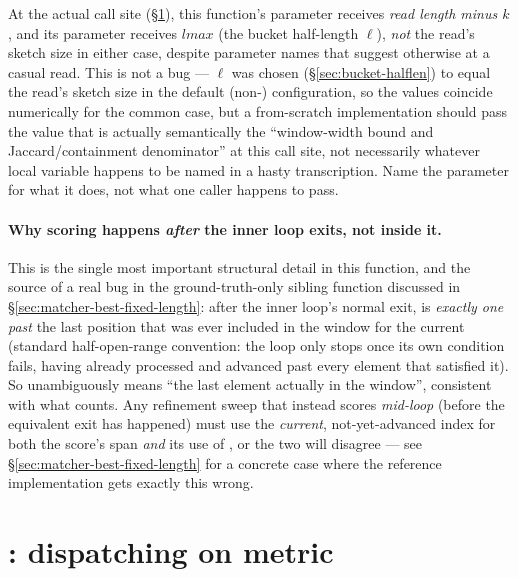 \begin{notebox}
\label{sec:m-vs-psz-confusion}
At the actual call site (\S\ref{sec:find-best-mapping}), this function's  parameter
receives \emph{read length minus $k$}, and its  parameter receives $\mathit{lmax}$ (the
bucket half-length $\ell$), \emph{not} the read's sketch size in either case, despite parameter
names that suggest otherwise at a casual read. This is not a bug --- $\ell$ was chosen
(\S\ref{sec:bucket-halflen}) to equal the read's sketch size in the default (non-)
configuration, so the values coincide numerically for the common case, but a from-scratch
implementation should pass the value that is actually semantically the ``window-width bound and
Jaccard/containment denominator'' at this call site, not necessarily whatever local variable
happens to be named  in a hasty transcription. Name the parameter for what it does,
not what one caller happens to pass.
\end{notebox}

\paragraph{Why scoring happens \emph{after} the inner  loop exits, not inside it.}
This is the single most important structural detail in this function, and the source of a real
bug in the ground-truth-only sibling function discussed in \S\ref{sec:matcher-best-fixed-length}:
after the inner loop's normal exit,  is \emph{exactly one past} the last position that
was ever included in the window for the current  (standard half-open-range convention:
the loop only stops once its own condition fails, having already processed and advanced past
every element that satisfied it). So  unambiguously means ``the last element
actually in the window'', consistent with what  counts. Any refinement sweep
that instead scores \emph{mid-loop} (before the equivalent exit has happened) must use the
\emph{current}, not-yet-advanced index for both the score's span \emph{and} its use of
, or the two will disagree --- see \S\ref{sec:matcher-best-fixed-length} for a
concrete case where the reference implementation gets exactly this wrong.

\section{: dispatching on metric}
\label{sec:find-best-mapping}

